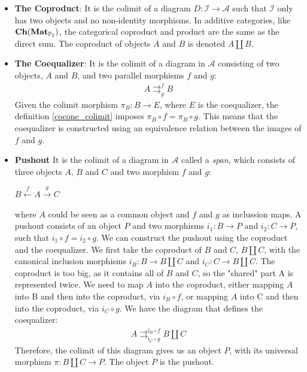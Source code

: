 \documentclass[12pt, twoside, openany]{book}
\newcommand{\catname}[1]{{\normalfont\textbf{#1}}}
\newcommand{\Ch}{\catname{Ch}}
\newcommand{\Mat}{\catname{Mat}}
\begin{document}
\begin{itemize}
    \item \textbf{The Coproduct}: It is the colimit of a diagram $D : \mathcal{I} \rightarrow \mathcal{A}$ such that $\mathcal{I}$ only has two objects and no non-identity morphisms. In additive categories, like $\Ch(\Mat_{\mathbb{F}_2})$, the categorical coproduct and product are the same as the direct sum. The coproduct of objects $A$ and $B$ is denoted $A \amalg B$.
    \item \textbf{The Coequalizer}: It is the colimit of a diagram in $\mathcal{A}$ consisting of two objects, $A$ and $B$, and two parallel morphisms $f$ and $g$:
    \begin{align*}
        A \mathrel{\mathop{\rightrightarrows}^{f}_{g}} B
    \end{align*}
    Given the colimit morphism $\pi_B: B \rightarrow E$, where $E$ is the coequalizer, the definition \ref{cocone_colimit} imposes $\pi_B \circ f = \pi_B \circ g$. This means that the coequalizer is constructed using an equivalence relation between the images of $f$ and $g$.
    \item \textbf{Pushout} It is the colimit of a diagram in $\mathcal{A}$ called a \textit{span}, which consists of three objects $A$, $B$ and $C$ and two morphism $f$ and $g$:
    \begin{center}
        $B \xleftarrow{f} A \xrightarrow{g} C$
    \end{center}
    where $A$ could be seen as a common object and $f$ and $g$ as inclussion maps. A pushout consists of an object $P$ and two morphisms $i_1: B \rightarrow P$ and $i_2: C \rightarrow P$, such that $i_1 \circ f = i_2 \circ g$. We can construct the pushout using the coproduct and the coequalizer. We first take the coproduct of $B$ and $C$, $B \amalg C$, with the canonical inclusion morphisms $i_B: B \rightarrow B \amalg C$ and $i_C: C \rightarrow B \amalg C$. The coproduct is too big, as it contains all of $B$ and $C$, so the "shared" part A is represented twice. We need to map $A$ into the coproduct, either mapping $A$ into B and then into the coproduct, via $i_B \circ f$, or mapping $A$ into C and then into the coproduct, via $i_C \circ g$. We have the diagram that defines the coequalizer:
    \begin{align*}
        A \mathrel{\mathop{\rightrightarrows}^{\text{i}_B \circ f}_{\text{i}_C \circ g}} B \amalg C
    \end{align*}
    Therefore, the colimit of this diagram gives us an object $P$, with its universal morphism $\pi : B \amalg C \rightarrow P$. The object $P$ is the pushout.
\end{itemize}
\end{document}
